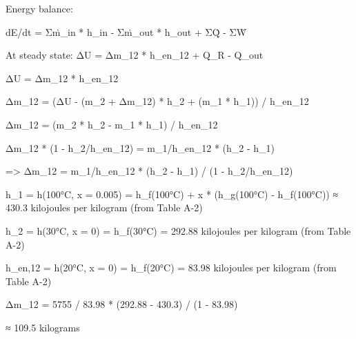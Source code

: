 Energy balance:  

dE/dt = Σṁ_in * h_in - Σṁ_out * h_out + ΣQ̇ - ΣẆ  

At steady state:  
ΔU = Δm_12 * h_en_12 + Q_R - Q_out  

ΔU = Δm_12 * h_en_12  

Δm_12 = (ΔU - (m_2 + Δm_12) * h_2 + (m_1 * h_1)) / h_en_12  

Δm_12 = (m_2 * h_2 - m_1 * h_1) / h_en_12  

Δm_12 * (1 - h_2/h_en_12) = m_1/h_en_12 * (h_2 - h_1)  

=> Δm_12 = m_1/h_en_12 * (h_2 - h_1) / (1 - h_2/h_en_12)

h_1 = h(100°C, x = 0.005) = h_f(100°C) + x * (h_g(100°C) - h_f(100°C))  
≈ 430.3 kilojoules per kilogram (from Table A-2)  

h_2 = h(30°C, x = 0) = h_f(30°C) = 292.88 kilojoules per kilogram (from Table A-2)  

h_en,12 = h(20°C, x = 0) = h_f(20°C) = 83.98 kilojoules per kilogram (from Table A-2)  

Δm_12 = 5755 / 83.98 * (292.88 - 430.3) / (1 - 83.98)  

≈ 109.5 kilograms